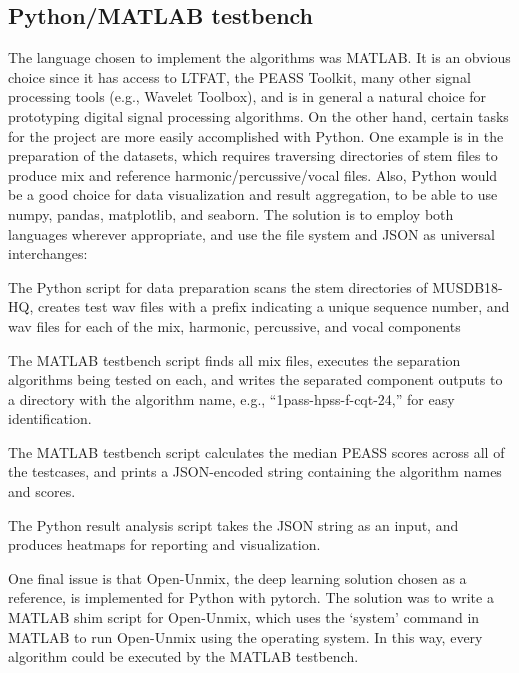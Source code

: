 \documentclass[letter,12pt]{article}
\newenvironment{tight_enumerate}{
\begin{enumerate}
  \setlength{\itemsep}{0pt}
  \setlength{\parskip}{0pt}
}{\end{enumerate}}
\begin{document}
\subsection{Python/MATLAB testbench}

The language chosen to implement the algorithms was MATLAB. It is an obvious choice since it has access to LTFAT, the PEASS Toolkit, many other signal processing tools (e.g., Wavelet Toolbox), and is in general a natural choice for prototyping digital signal processing algorithms. On the other hand, certain tasks for the project are more easily accomplished with Python. One example is in the preparation of the datasets, which requires traversing directories of stem files to produce mix and reference harmonic/percussive/vocal files. Also, Python would be a good choice for data visualization and result aggregation, to be able to use numpy\cite{numpy}, pandas\cite{pandas}, matplotlib\cite{matplotlib}, and seaborn\cite{seaborn}. The solution is to employ both languages wherever appropriate, and use the file system and JSON as universal interchanges:
\begin{tight_enumerate}
\item
	The Python script for data preparation scans the stem directories of MUSDB18-HQ, creates test wav files with a prefix indicating a unique sequence number, and wav files for each of the mix, harmonic, percussive, and vocal components
\item
	The MATLAB testbench script finds all mix files, executes the separation algorithms being tested on each, and writes the separated component outputs to a directory with the algorithm name, e.g., ``1pass-hpss-f-cqt-24,'' for easy identification.
\item
	The MATLAB testbench script calculates the median PEASS scores across all of the testcases, and prints a JSON-encoded string containing the algorithm names and scores.
\item
	The Python result analysis script takes the JSON string as an input, and produces heatmaps for reporting and visualization.
\end{tight_enumerate}

One final issue is that Open-Unmix, the deep learning solution chosen as a reference, is implemented for Python with pytorch\cite{pytorch}. The solution was to write a MATLAB shim script for Open-Unmix, which uses the `system' command in MATLAB to run Open-Unmix using the operating system. In this way, every algorithm could be executed by the MATLAB testbench.
\end{document}
